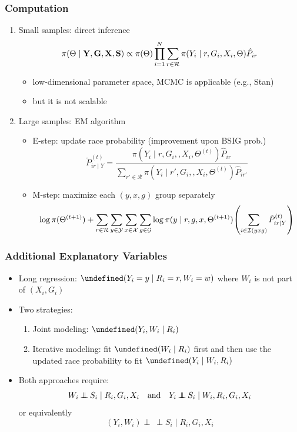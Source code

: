 \documentclass[handout]{beamer}
\let\Pr\undefined
\DeclareMathOperator{\Pr}{\mathbb{P}}
\newcommand{\indep}{\mathbin{\perp\!\!\!\!\!\:\perp}}
\newcommand{\cR}{\mathcal{R}}
\newcommand{\cG}{\mathcal{G}}
\newcommand{\cX}{\mathcal{X}}
\newcommand{\cY}{\mathcal{Y}}
\newcommand{\cI}{\mathcal{I}}
\begin{document}
\begin{frame}

  \frametitle{Computation}

  \begin{enumerate}
  \item Small samples: \alert{direct inference}
$$
    \pi(\Theta\mid \vb Y, \vb G, \vb X, \vb S)
    \propto \pi(\Theta) \prod_{i=1}^N \sum_{r\in\cR} \pi(Y_i\mid 
    r, G_i, X_i, \Theta)\hat{P}_{ir}
    $$
    \begin{itemize}
    \item low-dimensional parameter space, MCMC is applicable (e.g.,
      Stan)
    \item but it is not scalable
    \end{itemize}
    
  \item Large samples: \alert{EM algorithm}
    \begin{itemize}
    \item E-step: update race probability (improvement upon BSIG prob.)
      $$\tilde{P}_{ir\mid Y}^{(t)}
    = \frac{\pi(Y_i\mid r, G_i,, X_i, \Theta^{(t)}) \hat P_{ir}}{
        \sum_{r'\in\cR} \pi(Y_i\mid r', G_i,, X_i, \Theta^{(t)}) \hat P_{ir'} }$$
    \item M-step: maximize each $(y,x,g)$ group separately
      $$\log \pi(\Theta^{(t+1)}) + \sum_{r\in\cR}\sum_{y\in\cY}\sum_{x\in\cX}\sum_{g\in\cG} 
        \log \pi(y\mid r, g, x, \Theta^{(t+1)}) 
        \qty(\sum_{i\in\cI(yxg)} \tilde{P}_{ir\mid Y}^{(t)}) $$
    \end{itemize}

  \end{enumerate}

\end{frame}

\begin{frame}

  \frametitle{Additional Explanatory Variables}

  \begin{itemize}
  \item Long regression: $\Pr(Y_i  = y \mid R_i = r, W_i = w)$ where
    $W_i$ is not part of $(X_i, G_i)$
\vfill
  \item Two strategies:
    \begin{enumerate}
    \item Joint modeling: $\Pr(Y_i, W_i \mid R_i)$
    \item Iterative modeling: fit $\Pr(W_i \mid R_i)$ first and then use the
      updated race probability to fit $\Pr(Y_i \mid W_i, R_i)$
    \end{enumerate}
\vfill
\item Both approaches require:
   $$W_i\indep S_i\mid R_i,G_i,X_i \qand
   Y_i\indep S_i\mid W_i,R_i,G_i,X_i$$
   or equivalently
   $$(Y_i, W_i)\indep S_i\mid R_i,G_i,X_i$$
   \vspace{-.4in}
  \end{itemize}

\end{frame}
\end{document}
